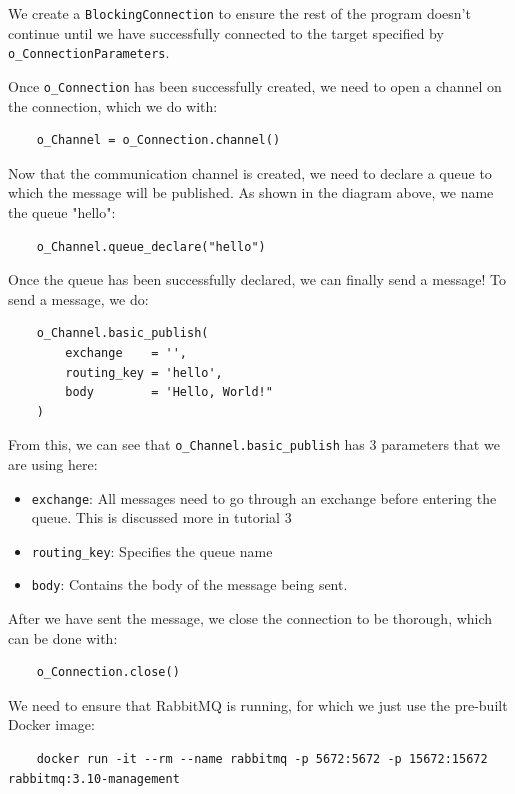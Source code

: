 \documentclass{article}
\begin{document}
We create a \verb|BlockingConnection| to ensure the rest of the program doesn't continue until we have successfully connected to the target specified by \verb|o_ConnectionParameters|.

Once \verb|o_Connection| has been successfully created, we need to open a channel on the connection, which we do with:

\begin{verbatim}
    o_Channel = o_Connection.channel()
\end{verbatim}

Now that the communication channel is created, we need to declare a queue to which the message will be published. As shown in the diagram above, we name the queue "hello":

\begin{verbatim}
    o_Channel.queue_declare("hello")
\end{verbatim}

Once the queue has been successfully declared, we can finally send a message! To send a message, we do:

\begin{verbatim}
    o_Channel.basic_publish(
        exchange    = '',
        routing_key = 'hello',
        body        = 'Hello, World!"
    )
\end{verbatim}

From this, we can see that \verb|o_Channel.basic_publish| has 3 parameters that we are using here:

\begin{itemize}
    \item \verb|exchange|: All messages need to go through an exchange before entering the queue. This is discussed more in tutorial 3
    \item \verb|routing_key|: Specifies the queue name
    \item \verb|body|: Contains the body of the message being sent.
\end{itemize}

After we have sent the message, we close the connection to be thorough, which can be done with:

\begin{verbatim}
    o_Connection.close()
\end{verbatim}

We need to ensure that RabbitMQ is running, for which we just use the pre-built Docker image:

\begin{verbatim}
    docker run -it --rm --name rabbitmq -p 5672:5672 -p 15672:15672 rabbitmq:3.10-management
\end{verbatim}
\end{document}
